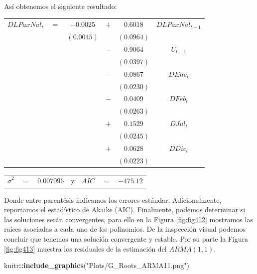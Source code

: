 \documentclass[
]{book}
\newenvironment{Shaded}{\begin{snugshade}}{\end{snugshade}}
\newcommand{\FunctionTok}[1]{\textcolor[rgb]{0.13,0.29,0.53}{\textbf{#1}}}
\newcommand{\NormalTok}[1]{#1}
\newcommand{\SpecialCharTok}[1]{\textcolor[rgb]{0.81,0.36,0.00}{\textbf{#1}}}
\newcommand{\StringTok}[1]{\textcolor[rgb]{0.31,0.60,0.02}{#1}}
\begin{document}
Así obtenemos el siguiente resultado:

\begin{center}
\begin{tabular}{ c c c c c c } 
    $DLPaxNal_t$ & $=$ & $-0.0025$ & $+$ & $0.6018$  & $DLPaxNal_{t-1}$ \\ 
    &  & $(0.0045)$ &  & $(0.0964)$ & \\
    &  &  & $-$ & $0.9064$ & $U_{t-1}$ \\
    &  &  &  & $(0.0397)$ & \\
    &  &  & $-$ & $0.0867$ & $DEne_t$ \\
    &  &  &  & $(0.0230)$ & \\
    &  &  & $-$ & $0.0409$ & $DFeb_t$ \\
    &  &  &  & $(0.0263)$ & \\
    &  &  & $+$ & $0.1529$ & $DJul_t$ \\
    &  &  &  & $(0.0245)$ & \\
    &  &  & $+$ & $0.0628$ & $DDic_t$ \\
    &  &  &  & $(0.0223)$ &
\end{tabular}
\end{center}

\begin{center}
\begin{tabular}{ c c c c c c c } 
    $\hat{\sigma}^2$ & $=$ & $0.007096$ & y & $AIC$ & $=$ & $-475.12$ 
\end{tabular}
\end{center}

Donde entre parentésis indicamos los errores estándar. Adicionalmente, reportamos el estadístico de Akaike (AIC). Finalmente, podemos determinar si las soluciones serán convergentes, para ello en la Figura \ref{fig:fig412} mostramos las raíces asociadas a cada uno de los polinomios. De la inspección visual podemos concluir que tenemos una solución convergente y estable. Por su parte la Figura \ref{fig:fig413} muestra los residuales de la estimación del \(ARMA(1, 1)\).

\begin{Shaded}
\begin{Highlighting}[]
\NormalTok{knitr}\SpecialCharTok{::}\FunctionTok{include\_graphics}\NormalTok{(}\StringTok{"Plots/G\_Roots\_ARMA11.png"}\NormalTok{) }
\end{Highlighting}
\end{Shaded}
\end{document}
